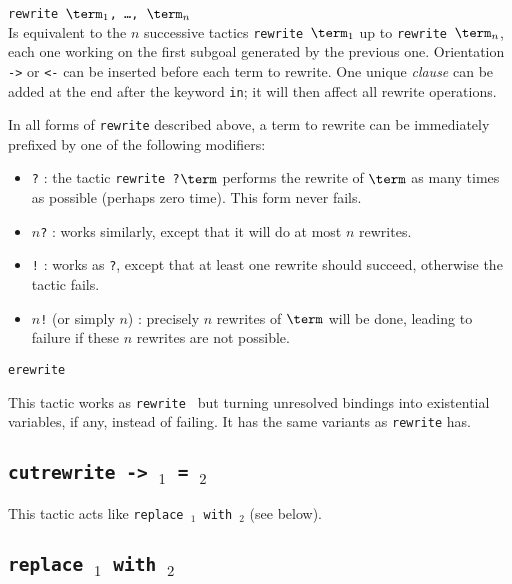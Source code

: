 \begin{Variants}
\item {\tt rewrite $\term_1$, \ldots, $\term_n$}\\
  Is equivalent to the $n$ successive tactics {\tt rewrite $\term_1$}
  up to {\tt rewrite $\term_n$}, each one working on the first subgoal
  generated by the previous one.
  Orientation {\tt ->} or {\tt <-} can be
  inserted before each term to rewrite. One unique \textit{clause}
  can be added at the end after the keyword {\tt in}; it will 
  then affect all rewrite operations.

\item In all forms of {\tt rewrite} described above, a term to rewrite
  can be immediately prefixed by one of the following modifiers:
  \begin{itemize}
  \item {\tt ?} : the tactic {\tt rewrite ?$\term$} performs the
    rewrite of $\term$  as many times as possible (perhaps zero time).
    This form never fails. 
  \item {\tt $n$?} : works similarly, except that it will do at most 
   $n$ rewrites. 
  \item {\tt !} : works as {\tt ?}, except that at least one rewrite 
    should succeed, otherwise the tactic fails. 
  \item {\tt $n$!} (or simply {\tt $n$}) : precisely $n$ rewrites 
    of $\term$ will be done, leading to failure if these $n$ rewrites are not possible. 
  \end{itemize}

\item {\tt erewrite {\term}}

This tactic works as {\tt rewrite {\term}} but turning unresolved
bindings into existential variables, if any, instead of failing. It has
the same variants as {\tt rewrite} has.

\end{Variants}


\subsection{\tt cutrewrite -> \term$_1$ = \term$_2$
\label{cutrewrite}
}

This tactic acts like {\tt replace {\term$_1$} with {\term$_2$}}
(see below).

\subsection{\tt replace {\term$_1$} with {\term$_2$}
\label{tactic:replace}
}

